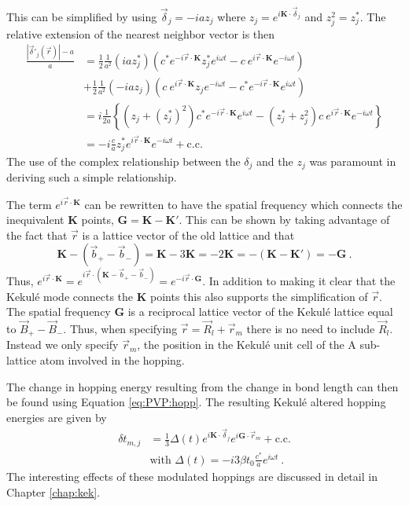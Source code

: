 This can be simplified by using $\vec{\delta}_j=-i a z_j$ where $z_j= e^{i \bm{K} \cdot \vec{\delta}_j}$ and $z_j^2=z_j^*$.
The relative extension of the nearest neighbor vector is then
\begin{align*}
	\frac{|\vec{\delta}'_j(\vec{r})|-a}{a}&=
		\frac{1}{2} \frac{1}{a^2} (i a z_j^*) 
		\left( c^* e^{-i\vec{r} \cdot \bm{K}} z_j^* e^{i \omega t} - c \ e^{i\vec{r} \cdot \bm{K}} e^{-i \omega t} \right) \\
	&+\frac{1}{2}\frac{1}{a^2} (-ia z_j)
		\left( c \ e^{i\vec{r} \cdot \bm{K}} z_j e^{-i \omega t} - c^* e^{-i\vec{r} \cdot \bm{K}} e^{i \omega t} \right) \\
	&=i \frac{1}{2a} \left\{
		(z_j+(z_j^*)^2) c^* e^{-i\vec{r} \cdot \bm{K}} e^{i \omega t}
		-(z_j^*+z_j^2)c \ e^{i\vec{r} \cdot \bm{K}} e^{-i \omega t}
		\right\} \\
	&=-i \frac{c}{a} z_j^* e^{i\vec{r} \cdot \bm{K}} e^{-i \omega t} + \text{c.c.}
\end{align*}
The use of the complex relationship between the $\delta_j$ and the $z_j$ was paramount in deriving such a simple relationship.

The term $e^{i \vec{r} \cdot \bm{K}}$ can be rewritten to have the spatial frequency which connects the inequivalent $\bm{K}$ points, $\bm{G}=\bm{K}-\bm{K'}$.
This can be shown by taking advantage of the fact that $\vec{r}$ is a lattice vector of the old lattice and that
\begin{equation*}
	\bm{K}-(\vec{b}_+-\vec{b}_-)=\bm{K}-3 \bm{K}=-2 \bm{K}=-(\bm{K}-\bm{K'})=-\bm{G} \ .
\end{equation*} 
Thus, $e^{i \vec{r}\cdot \bm{K}}=e^{i\vec{r}\cdot(\bm{K} - \vec{b}_+-\vec{b}_-)}= e^{-i \vec{r} \cdot \bm{G}}$.
In addition to making it clear that the Kekul\'e mode connects the $\bm{K}$ points this also supports the simplification of $\vec{r}$.
The spatial frequency $\bm{G}$ is a reciprocal lattice vector of the Kekul\'e lattice equal to $\vec{B}_+ - \vec{B}_-$.
Thus, when specifying $\vec{r}=\vec{R}_l+\vec{r}_m$ there is no need to include $\vec{R}_l$.
Instead we only specify $\vec{r}_m$, the position in the Kekul\'e unit cell of the A sub-lattice atom involved in the hopping.

The change in hopping energy resulting from the change in bond length can then be found using Equation \ref{eq:PVP:hopp}.
The resulting Kekul\'e altered hopping energies are given by
\begin{align*}
	\delta t_{m,j}&=\frac{1}{3} \Delta(t) e^{i \bm{K} \cdot \vec{\delta}_j} e^{i \bm{G} \cdot \vec{r}_m}+\text{c.c.} \nonumber \\
	& \text{with } \Delta(t)=-i 3 \beta t_0 \frac{c^*}{a} e^{i \omega t} \ .
\end{align*}
The interesting effects of these modulated hoppings are discussed in detail in Chapter \ref{chap:kek}.